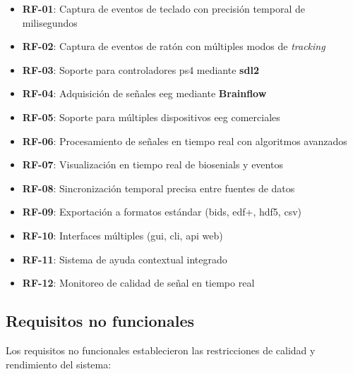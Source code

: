 \begin{itemize}
    \item \textbf{RF-01}: Captura de eventos de teclado con precisión temporal de milisegundos
    \item \textbf{RF-02}: Captura de eventos de ratón con múltiples modos de \textit{tracking}
    \item \textbf{RF-03}: Soporte para controladores \acrshort{ps4} mediante \textbf{\acrshort{sdl}2}
    \item \textbf{RF-04}: Adquisición de señales \acrshort{eeg} mediante \textbf{Brainflow}
    \item \textbf{RF-05}: Soporte para múltiples dispositivos \acrshort{eeg} comerciales
    \item \textbf{RF-06}: Procesamiento de señales en tiempo real con algoritmos avanzados
    \item \textbf{RF-07}: Visualización en tiempo real de \glspl{biosenial} y eventos
    \item \textbf{RF-08}: Sincronización temporal precisa entre fuentes de datos
    \item \textbf{RF-09}: Exportación a formatos estándar (\acrshort{bids}, \acrshort{edf+}, \acrshort{hdf5}, \acrshort{csv})
    \item \textbf{RF-10}: Interfaces múltiples (\acrshort{gui}, \acrshort{cli}, \acrshort{api} web)
    \item \textbf{RF-11}: Sistema de ayuda contextual integrado
    \item \textbf{RF-12}: Monitoreo de calidad de señal en tiempo real
\end{itemize}

\subsection{Requisitos no funcionales}
\label{subsec:requisitos_no_funcionales}

Los requisitos no funcionales establecieron las restricciones de calidad y rendimiento del sistema:

